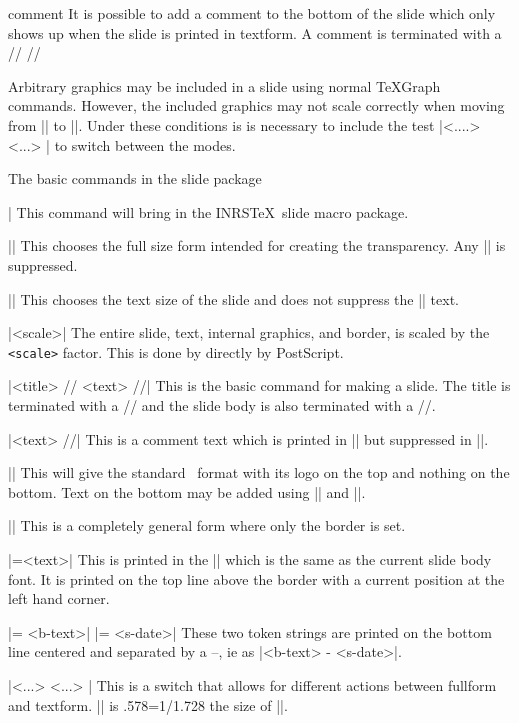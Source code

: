 \1comment 
It is possible to add a comment to the bottom of the slide which
only shows up when the slide is printed in textform. A comment is
terminated with a {//} //
\endttverbatim


Arbitrary graphics may be included in a slide using normal \TeX Graph
commands. However, the included graphics may not scale correctly when
moving from |\fullform| to |\textform|. Under these conditions is is
necessary to include the test |\iftextform <....> \else <...> \fi| to
switch between the modes. 


The basic commands in the slide package

\beginblockmode
\ext\@|
\nbr
This command will bring in the INRS\TeX\ slide macro package. 

\mbr\ext\@|\fullform|
\nbr
This chooses the full size form intended for creating the transparency. Any
|\comment| is suppressed.

\mbr\ext\@|\textform|
\nbr
This chooses the text size of the slide and does not suppress the
|\comment| text.

\mbr\ext\@|\formscale <scale>|
\nbr
The entire slide, text, internal graphics, and border, is  scaled 
by the {\tt <scale>} factor. This is done by directly by PostScript. 

\mbr\ext\@|\hslide <title> // <text> //|
This is the basic command for making a slide. The title is terminated with
a // and the slide body is also terminated with a //. 

\mbr\ext\@|\comment <text> //|
This is a comment text which is printed in |\textform| but suppressed in
|\fullform|. 

\mbr\ext\@|\inrsform|
This will give the standard \INRS\ format with its logo on the top and
nothing on the bottom. Text on the bottom may be added using |\botdata| and
|\slidedate|.

\mbr\ext\@|\genform|
\nbr
This is a completely general form where only the border is set.

\mbr\ext\@|\topdata ={<text>}|
This is printed in the |\borderfont| which is the same as the current slide
body font. It is printed on the top line above the border with a current
position at the left hand corner. 

\mbr\ext\@|\botdata = {<b-text>}|
\mbr\ext\@|\slidedate = {<s-date>}|
\nbr 
These two token strings are printed on the bottom line centered and
separated by a --, ie as |<b-text> - <s-date>|. 

\mbr\ext\@|\iftextform <...> \else <...> \fi|
\nbr
This is a switch that allows for different actions between fullform and
textform. |\textform| is .578=1/1.728 the size of |\fullform|.

